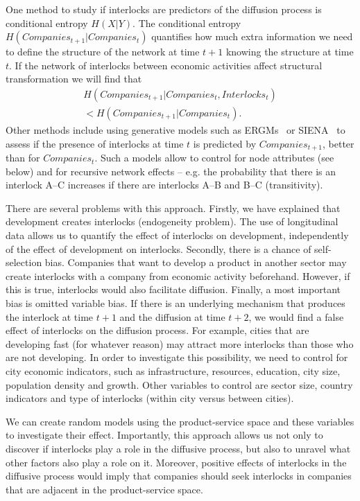 One method to study if interlocks are predictors of the diffusion process is conditional entropy $H(X|Y)$.
The conditional entropy  $H(Companies_{t+1}|Companies_{t})$ quantifies how much extra information we need to define the structure of the network at time $t+1$ knowing the structure at time $t$. 
If the network of interlocks between economic activities affect structural transformation we will find that 
\begin{equation}
\begin{split}
H(Companies_{t+1}|Companies_{t},Interlocks_{t}) \\
< H(Companies_{t+1}|Companies_{t}).
\end{split}
\end{equation}
Other methods include using generative models such as ERGMs~\citep{robins2007introduction} or SIENA~\citep{snijders2008introduction} to assess if the presence of interlocks at time $t$ is predicted by $Companies_{t+1}$,
better than for $Companies_{t}$.
Such a models allow to control for node attributes (see below) and for recursive network effects 
-- e.g. the probability that there is an interlock A--C increases if there are interlocks A--B and B--C (transitivity).

There are several problems with this approach.
Firstly, we have explained that development creates interlocks (endogeneity problem).
The use of longitudinal data allows us to quantify the effect of interlocks on development,
independently of the effect of development on interlocks.
Secondly, there is a chance of self-selection bias.
Companies that want to develop a product in another sector may create interlocks with a company from economic activity beforehand.
However, if this is true, interlocks would also facilitate diffusion.
Finally, a most important bias is omitted variable bias.
If there is an underlying mechanism that produces the interlock at time $t + 1$ and the diffusion at time $t + 2$, 
we would find a false effect of interlocks on the diffusion process.
For example, cities that are developing fast (for whatever reason) may attract more interlocks than those who are not developing.
In order to investigate this possibility, we need to control for city economic indicators, such as infrastructure, resources, education, city size, population density and growth.
Other variables to control are sector size, country indicators and type of interlocks (within city versus between cities).


We can create random models using the product-service space and these variables to investigate their effect.
Importantly, this approach allows us not only to discover if interlocks play a role in the diffusive process, 
but also to unravel what other factors also play a role on it.
Moreover, positive effects of interlocks in the diffusive process would imply that companies should seek interlocks in companies that are adjacent in the product-service space.


